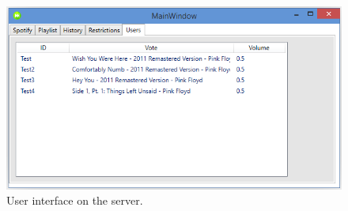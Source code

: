 \begin{figure}[hbtp]
  \centering
  \includegraphics[width=\textwidth]{Images/ServerInterfaceUsers.png}
  \caption{User interface on the server.}\label{fig:ServerInterfaceUsers}
\end{figure}

